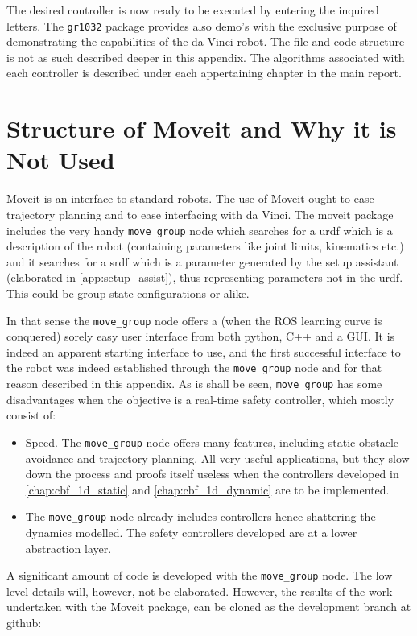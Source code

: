 The desired controller is now ready to be executed by entering the inquired letters. The \texttt{gr1032} package provides also demo's with the exclusive purpose of demonstrating the capabilities of the da Vinci robot. The file and code structure is not as such described deeper in this appendix. The algorithms associated with each controller is described under each appertaining chapter in the main report. 

\section{Structure of Moveit and Why it is Not Used}\label{sec:moveit}
Moveit is an interface to standard robots. The use of Moveit ought to ease trajectory planning and to ease interfacing with da Vinci. The moveit package includes the very handy \texttt{move\_group} node which searches for a \gls{urdf} which is a description of the robot (containing parameters like joint limits, kinematics etc.) and it searches for a \gls{srdf} which is 	a parameter generated by the setup assistant (elaborated in \autoref{app:setup_assist}), thus representing parameters not in the \gls{urdf}. This could be group state configurations or alike.

In that sense the \texttt{move\_group} node offers a (when the ROS learning curve is conquered) sorely easy user interface from both python, C++ and a GUI. It is indeed an apparent starting interface to use, and the first successful interface to the robot was indeed established through the \texttt{move\_group} node and for that reason described in this appendix. As is shall be seen, \texttt{move\_group} has some disadvantages when the objective is a real-time safety controller, which mostly consist of:
\begin{itemize}
\item Speed. The \texttt{move\_group} node offers many features, including static obstacle avoidance and trajectory planning. All very useful applications, but they slow down the process and proofs itself useless when the controllers developed in \autoref{chap:cbf_1d_static} and \autoref{chap:cbf_1d_dynamic} are to be implemented.
\item The \texttt{move\_group} node already includes controllers hence shattering the dynamics modelled. The safety controllers developed are at a lower abstraction layer.
\end{itemize}
A significant amount of code is developed with the \texttt{move\_group} node. The low level details will, however, not be elaborated. However, the results of the work undertaken with the Moveit package, can be cloned as the development branch at github:

